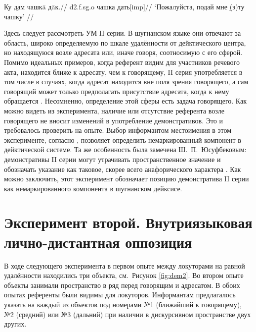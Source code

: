 \begingl
\gla Ку \b{дам} чашкā дāк.//
 {\sc d2.f.sg.o} чашка дать[{\sc imp}]//
\glft ‘Пожалуйста, подай мне \b{(э)ту} чашку’ //
\endgl \xe

Здесь следует рассмотреть УМ II серии. В шугнанском языке они отвечают за область, широко определяемую по шкале удалённости от дейктического центра, но находящуюся возле адресата или, иначе говоря, соотносимую с его сферой. Помимо идеальных примеров, когда референт видим для участников речевого акта, находится ближе к адресату, чем к говорящему, II серия употребляется в том числе в случаях, когда адресат находится вне поля зрения говорящего, а сам говорящий может только предполагать присутствие адресата, когда к нему обращается \parencite[20–25]{yusufbekov1998}. Несомненно, определение этой сферы есть задача говорящего. Как можно видеть из эксперимента, наличие или отсутствие референта возле говорящего не вносит изменений в употребление демонстративов. Это и требовалось проверить на опыте. Выбор информантом местоимения в этом эксперименте, согласно \parencite[27]{popiel2009}, позволяет определить немаркированный компонент в дейктической системе. Та же особенность была замечена Ш.~П.~Юсуфбековым: демонстративы II серии могут утрачивать пространственное значение и обозначать указание как таковое, скорее всего анафорического характера \parencite[22]{yusufbekov1998}. Как можно заключить, этот эксперимент обозначает позицию демонстратива II серии как немаркированного компонента в шугнанском дейксисе.

\section{Эксперимент второй. Внутриязыковая лично-дистантная оппозиция} \label{dem-exp2}

В ходе следующего эксперимента в первом опыте между локуторами на равной удалённости находились три объекта, см.~Рисунок \ref{fig:dem2}. Во втором опыте объекты занимали пространство в ряд перед говорящим и адресатом. В обоих опытах референты были видимы для локуторов. Информантам предлагалось указать на каждый из объектов под номерами №1 (ближайший к говорящему), №2 (средний) или №3 (дальний) при наличии в дискурсивном пространстве двух других.

